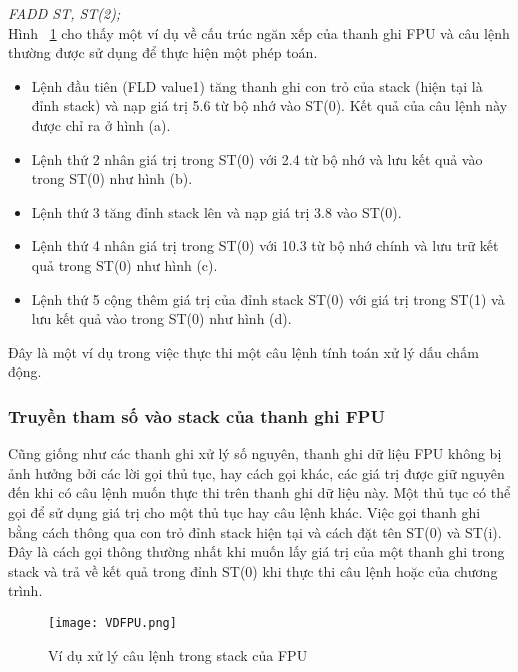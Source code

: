 	\textit{	FADD ST, ST(2);} \\
	
	Hình ~\ref{fig:VDFPU} cho thấy một ví dụ về cấu trúc ngăn xếp của thanh ghi FPU và câu lệnh thường được sử dụng để thực hiện một phép toán. 
	\begin{itemize}
		\item[1]	Lệnh đầu tiên (FLD value1) tăng thanh ghi con trỏ của stack (hiện tại là đỉnh stack) và nạp giá trị 5.6 từ bộ nhớ vào ST(0). Kết quả của câu lệnh này được chỉ ra ở hình (a).
		\item[2]	Lệnh thứ 2 nhân giá trị trong ST(0) với 2.4 từ bộ nhớ và lưu kết quả vào trong ST(0) như hình (b).
		\item[3] Lệnh thứ 3 tăng đỉnh stack lên và nạp giá trị 3.8 vào ST(0).
		\item[4]	Lệnh thứ 4 nhân giá trị trong ST(0) với 10.3 từ bộ nhớ chính và lưu trữ kết quả trong ST(0) như hình (c).
		\item[5]	Lệnh thứ 5 cộng thêm giá trị của đỉnh stack ST(0) với giá trị trong ST(1) và lưu kết quả vào trong ST(0) như hình (d).
	\end{itemize}
	
		Đây là một ví dụ trong việc thực thi một câu lệnh tính toán xử lý dấu chấm động.
	
	\subsubsection*{Truyền tham số vào stack của thanh ghi FPU}	
	Cũng giống như các thanh ghi xử lý số nguyên, thanh ghi dữ liệu FPU không bị ảnh hưởng bởi các lời gọi thủ tục, hay cách gọi khác, các giá trị được giữ nguyên đến khi có câu lệnh muốn thực thi trên thanh ghi dữ liệu này. Một thủ tục có thể gọi để sử dụng giá trị cho một thủ tục hay câu lệnh khác. Việc gọi thanh ghi bằng cách thông qua con trỏ đỉnh stack hiện tại và cách đặt tên ST(0) và ST(i). Đây là cách gọi thông thường nhất khi muốn lấy giá trị của một thanh ghi trong stack và trả về kết quả trong đỉnh ST(0) khi thực thi câu lệnh hoặc của chương trình.
	
	\begin{center}
			\begin{figure}[htp]
				\begin{center}
					\texttt{[image: VDFPU.png]}
				\end{center}
				\caption{Ví dụ xử lý câu lệnh trong stack của FPU}				
				\label{fig:VDFPU}				
			\end{figure}
		\end{center}	
		
